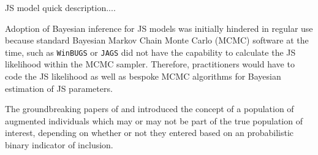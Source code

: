 \documentclass[12pt]{article}
\begin{document}
JS model quick description....

Adoption of Bayesian inference for JS models was initially hindered in regular use because standard Bayesian Markov Chain Monte Carlo (MCMC) software at the time, such as {\tt WinBUGS} \citep{LunnEtAl2000a} or {\tt JAGS} \citep{plummer2003jags} did not have the capability to calculate the JS likelihood within the MCMC sampler. Therefore, practitioners would have to code the JS likelihood as well as bespoke MCMC algorithms for Bayesian estimation of JS parameters. 

The groundbreaking papers of \cite{Durban:2005yw} and \cite{Royle:2007kx} introduced the concept of a population of augmented individuals which may or may not be part of the true population of interest, depending on whether or not they entered based on an probabilistic binary indicator of inclusion. 


\end{document}
